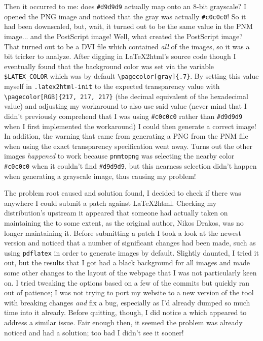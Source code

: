 \documentclass{article}
\begin{document}
Then it occurred to me: does \texttt{#d9d9d9} actually map onto an 8-bit grayscale?  I opened the PNG image and noticed that the gray was actually \texttt{#c0c0c0}!  So it had been downscaled, but, wait, it turned out to be the same value in the PNM image... and the PostScript image!  Well, what created the PostScript image?  That turned out to be a DVI file which contained \emph{all} of the images, so it was a bit tricker to analyze.  After digging in \LaTeX2html's source code though I eventually found that the background color was set via the variable \texttt{\$LATEX_COLOR} which was by default \verb+\pagecolor[gray]{.7}+.  By setting this value myself in \texttt{.latex2html-init} to the expected transparency value with \verb+\pagecolor[RGB]{217, 217, 217}+ (the decimal equivalent of the hexadecimal value) and adjusting my workaround to also use said value (never mind that I didn't previously comprehend that I was using \texttt{#c0c0c0} rather than \texttt{#d9d9d9} when I first implemented the workaround) I could then generate a correct image!  In addition, the warning that came from generating a PNG from the PNM file when using the exact transparency specification went away.  Turns out the other images \emph{happened} to work because \texttt{pnmtopng} was selecting the nearby color \texttt{#c0c0c0} when it couldn't find \texttt{#d9d9d9}, but this nearness selection didn't happen when generating a grayscale image, thus causing my problem!

The problem root caused and solution found, I decided to check if there was anywhere I could submit a patch against \LaTeX2html.  Checking my distribution's upstream it appeared that someone had actually taken on maintaining the  to some extent, as the original author, Nikos Drakos, was no longer maintaining it.  Before submitting a patch I took a look at the newest version and noticed that a number of significant changes had been made, such as using \texttt{pdflatex} in order to generate images by default.  Slightly daunted, I tried it out, but the results that I got had a black background for all images and made some other changes to the layout of the webpage that I was not particularly keen on.  I tried tweaking the options based on a few of the commits but quickly ran out of patience; I was not trying to port my website to a new version of the tool with breaking changes \emph{and} fix a bug, especially as I'd already dumped so much time into it already.  Before quitting, though, I did notice a  which appeared to address a similar issue.  Fair enough then, it seemed the problem was already noticed and had a solution; too bad I didn't see it sooner!
\end{document}
